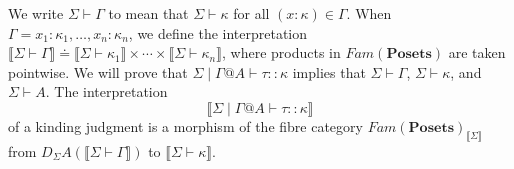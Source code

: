 \documentclass{article}
\newcommand{\mbf}{\mathbf}
\newcommand{\sem}[1]{\llbracket #1 \rrbracket}
\begin{document}
We write $\Sigma \vdash \Gamma$ to mean that $\Sigma \vdash \kappa$ for all $(x : \kappa) \in \Gamma$.
When $\Gamma = x_1 : \kappa_1, \ldots, x_n : \kappa_n$, we define the interpretation $\sem{\Sigma \vdash \Gamma} \doteq \sem{\Sigma \vdash \kappa_1} \times \cdots \times \sem{\Sigma \vdash \kappa_n}$, where products in $\mathit{Fam}(\mbf{Posets})$ are taken pointwise.
We will prove that $\Sigma \mid \Gamma @ A \vdash \tau :: \kappa$ implies that $\Sigma \vdash \Gamma$, $\Sigma \vdash \kappa$, and $\Sigma \vdash A$. The interpretation $$\sem{\Sigma \mid \Gamma @ A \vdash \tau :: \kappa}$$ of a kinding judgment is a morphism of the fibre category $\mathit{Fam}(\mbf{Posets})_{\sem{\Sigma}}$ from $D_{\Sigma} A(\sem{\Sigma \vdash \Gamma})$ to $\sem{\Sigma \vdash \kappa}$.

\end{document}
